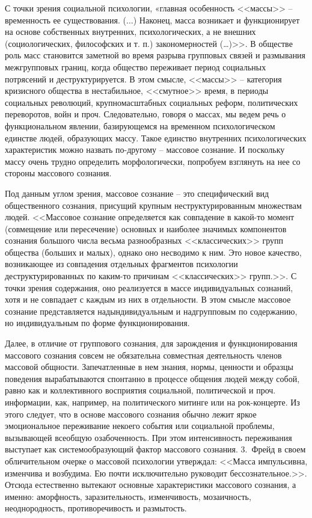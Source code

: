 С точки зрения социальной психологии,  «главная особенность <<массы>> -- временность ее существования. ($\ldots$)
Наконец, масса возникает и функционирует на основе собственных внутренних, психологических,
а не внешних (социологических, философских и т. п.) закономерностей (\ldots)>>\autocite{olshansky}.
В обществе роль масс становится заметной во время разрыва групповых связей и размывания
межгрупповых границ, когда общество переживает период социальных потрясений и деструктурируется.
В этом смысле, <<массы>> -- категория кризисного общества в нестабильное, <<смутное>> время, в периоды
социальных революций, крупномасштабных социальных реформ,
политических переворотов, войн и проч. Следовательно, говоря о массах, мы ведем речь о функциональном явлении,
базирующемся на временном психологическом единстве людей, образующих массу. Такое единство внутренних психологических
характеристик можно назвать по-другому -- массовое сознание. И поскольку массу очень трудно определить морфологически,
попробуем взглянуть на нее со стороны массового сознания.

Под данным углом зрения, массовое сознание -- это специфический вид общественного сознания, присущий крупным
неструктурированным множествам людей. <<Массовое сознание определяется как совпадение в какой-то момент
(совмещение или пересечение) основных и наиболее значимых компонентов сознания большого числа весьма
разнообразных <<классических>> групп общества (больших и малых), однако оно несводимо к ним. Это новое качество,
возникающее из совпадения отдельных фрагментов психологии деструктурированных по каким-то причинам <<классических>>
групп.>>\autocite{olshansky}.  С точки зрения содержания, оно реализуется в массе индивидуальных сознаний,
хотя и не совпадает с каждым из них в отдельности. В этом смысле массовое сознание представляется надындивидуальным
и надгрупповым по содержанию, но индивидуальным по форме функционирования.

Далее, в отличие от группового сознания, для зарождения и функционирования массового сознания совсем не
обязательна совместная деятельность членов массовой общности. Запечатленные в нем знания, нормы, ценности и
образцы поведения вырабатываются спонтанно в процессе общения людей между собой, равно как и коллективного
восприятия социальной, политической и проч. информации, как, например, на политического митинге или на рок-концерте.
Из этого следует, что в основе массового сознания обычно лежит яркое эмоциональное переживание некоего
события или социальной проблемы, вызывающей всеобщую озабоченность. При этом интенсивность переживания
выступает как системообразующий фактор массового сознания. 3.~Фрейд в своем обличительном очерке о массовой
психологии утверждал: <<Масса импульсивна, изменчива и возбудима. Ею почти исключительно руководит
бессознательное.>>\autocite{freid_mass}.  Отсюда естественно вытекают основные характеристики массового сознания,
а именно: аморфность, заразительность, изменчивость, мозаичность, неоднородность, противоречивость и
размытость\autocite{ashin}\autocite{flier}\autocite{prokudin}\autocite{heveshi}\autocite{hevishi2001tolpa}\autocite{streltsov1970}\autocite{dodonov1999}.

